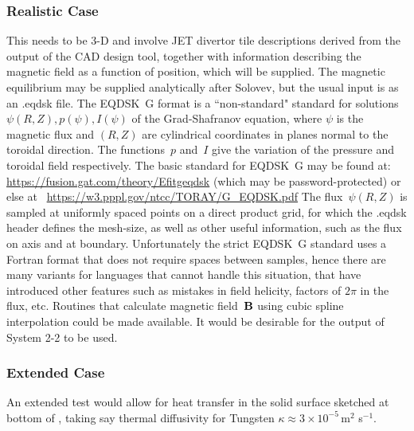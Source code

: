 \subsubsection{Realistic Case}\label{sec:realistic}
This needs to be 3-D and involve JET divertor tile descriptions derived from
the output of the CAD design tool, together with information
describing the magnetic field as a function of position, which will be supplied.
The magnetic equilibrium may be supplied analytically after Solovev, but the
usual input is as an .eqdsk file.
The EQDSK~G format is a ``non-standard" standard for
solutions $\psi(R,Z), p(\psi), I(\psi)$ of the Grad-Shafranov equation, where
$\psi$ is the magnetic flux and $(R,Z)$ are cylindrical coordinates
in planes normal to the toroidal direction. The functions~$p$ and~$I$ give the
variation of the pressure and toroidal field respectively.
The basic standard for EQDSK~G may be found at:
\url{https://fusion.gat.com/theory/Efitgeqdsk} (which may be password-protected)
or else at ~\url{https://w3.pppl.gov/ntcc/TORAY/G_EQDSK.pdf}
The flux~$\psi(R,Z)$ is sampled at uniformly spaced points on a direct product grid,
for which the .eqdsk header defines the mesh-size, as well as other useful
information, such as the flux on axis and at boundary.
Unfortunately the strict EQDSK~G standard uses a Fortran format that does
not require spaces between samples, hence there are many variants for
languages that cannot handle this situation, that have introduced other
features such as mistakes in field helicity, factors of $2\pi$ in the flux, etc.
Routines that calculate magnetic field~${\bf B}$ using cubic spline interpolation
could be made available. It would be desirable for the output of System 2-2
to be used.


\subsubsection{Extended Case}\label{sec:extended}
An extended test would allow for heat transfer in the solid surface sketched 
at bottom of , taking say thermal diffusivity for Tungsten
$\kappa \approx 3 \times 10^{-5}$\,m$^2$ s$^{-1}$. 
